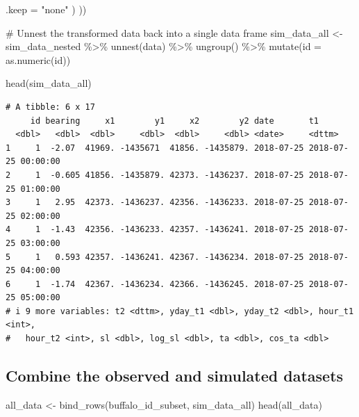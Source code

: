 \documentclass[
  letterpaper,
  DIV=11,
  numbers=noendperiod]{scrartcl}
\newenvironment{Shaded}{\begin{snugshade}}{\end{snugshade}}
\newcommand{\AttributeTok}[1]{\textcolor[rgb]{0.40,0.45,0.13}{#1}}
\newcommand{\CommentTok}[1]{\textcolor[rgb]{0.37,0.37,0.37}{#1}}
\newcommand{\FunctionTok}[1]{\textcolor[rgb]{0.28,0.35,0.67}{#1}}
\newcommand{\NormalTok}[1]{\textcolor[rgb]{0.00,0.23,0.31}{#1}}
\newcommand{\OtherTok}[1]{\textcolor[rgb]{0.00,0.23,0.31}{#1}}
\newcommand{\SpecialCharTok}[1]{\textcolor[rgb]{0.37,0.37,0.37}{#1}}
\newcommand{\StringTok}[1]{\textcolor[rgb]{0.13,0.47,0.30}{#1}}
\newcounter{none} %
\begin{document}
\begin{Shaded}
\begin{Highlighting}[]
      \AttributeTok{.keep =} \StringTok{"none"}
\NormalTok{    )}
\NormalTok{  ))}

\CommentTok{\# Unnest the transformed data back into a single data frame}
\NormalTok{sim\_data\_all }\OtherTok{\textless{}{-}}\NormalTok{ sim\_data\_nested }\SpecialCharTok{\%\textgreater{}\%} 
  \FunctionTok{unnest}\NormalTok{(data) }\SpecialCharTok{\%\textgreater{}\%} 
  \FunctionTok{ungroup}\NormalTok{() }\SpecialCharTok{\%\textgreater{}\%} 
  \FunctionTok{mutate}\NormalTok{(}\AttributeTok{id =} \FunctionTok{as.numeric}\NormalTok{(id))}

\FunctionTok{head}\NormalTok{(sim\_data\_all)}
\end{Highlighting}
\end{Shaded}

\begin{verbatim}
# A tibble: 6 x 17
     id bearing     x1        y1     x2        y2 date       t1                 
  <dbl>   <dbl>  <dbl>     <dbl>  <dbl>     <dbl> <date>     <dttm>             
1     1  -2.07  41969. -1435671  41856. -1435879. 2018-07-25 2018-07-25 00:00:00
2     1  -0.605 41856. -1435879. 42373. -1436237. 2018-07-25 2018-07-25 01:00:00
3     1   2.95  42373. -1436237. 42356. -1436233. 2018-07-25 2018-07-25 02:00:00
4     1  -1.43  42356. -1436233. 42357. -1436241. 2018-07-25 2018-07-25 03:00:00
5     1   0.593 42357. -1436241. 42367. -1436234. 2018-07-25 2018-07-25 04:00:00
6     1  -1.74  42367. -1436234. 42366. -1436245. 2018-07-25 2018-07-25 05:00:00
# i 9 more variables: t2 <dttm>, yday_t1 <dbl>, yday_t2 <dbl>, hour_t1 <int>,
#   hour_t2 <int>, sl <dbl>, log_sl <dbl>, ta <dbl>, cos_ta <dbl>
\end{verbatim}

\subsection{Combine the observed and simulated
datasets}\label{combine-the-observed-and-simulated-datasets}

\begin{Shaded}
\begin{Highlighting}[]
\NormalTok{all\_data }\OtherTok{\textless{}{-}} \FunctionTok{bind\_rows}\NormalTok{(buffalo\_id\_subset, sim\_data\_all)}
\FunctionTok{head}\NormalTok{(all\_data)}
\end{Highlighting}
\end{Shaded}
\end{document}
